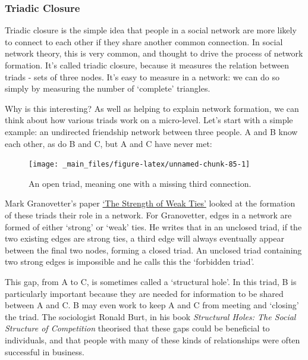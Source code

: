 \documentclass[
]{book}
\begin{document}
\hypertarget{triadic-closure}{%
\subsubsection{Triadic Closure}\label{triadic-closure}}

Triadic closure is the simple idea that people in a social network are more likely to connect to each other if they share another common connection. In social network theory, this is very common, and thought to drive the process of network formation. It's called triadic closure, because it measures the relation between triads - sets of three nodes. It's easy to measure in a network: we can do so simply by measuring the number of `complete' triangles.

Why is this interesting? As well as helping to explain network formation, we can think about how various triads work on a micro-level. Let's start with a simple example: an undirected friendship network between three people. A and B know each other, as do B and C, but A and C have never met:

\begin{figure}

{\centering \texttt{[image: \_main\_files/figure-latex/unnamed-chunk-85-1]} 

}

\caption{An open triad, meaning one with a missing third connection.}\label{fig:unnamed-chunk-85}
\end{figure}

Mark Granovetter's paper \href{https://www.jstor.org/stable/2776392}{`The Strength of Weak Ties'} looked at the formation of these triads their role in a network. For Granovetter, edges in a network are formed of either `strong' or `weak' ties. He writes that in an unclosed triad, if the two existing edges are strong ties, a third edge will always eventually appear between the final two nodes, forming a closed triad. An unclosed triad containing two strong edges is impossible and he calls this the `forbidden triad'.

This gap, from A to C, is sometimes called a `structural hole'. In this triad, B is particularly important because they are needed for information to be shared between A and C. B may even work to keep A and C from meeting and `closing' the triad. The sociologist Ronald Burt, in his book \emph{Structural Holes: The Social Structure of Competition} theorised that these gaps could be beneficial to individuals, and that people with many of these kinds of relationships were often successful in business.
\end{document}
